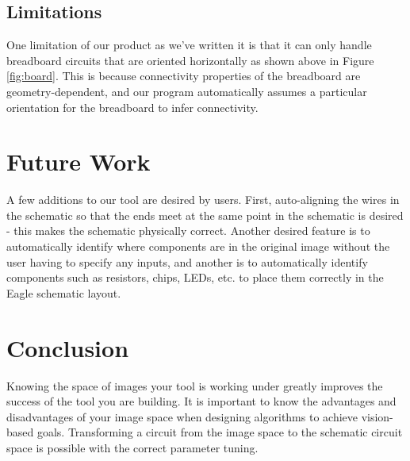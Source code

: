 \documentclass[10pt,twocolumn,letterpaper]{article}
\begin{document}
\subsection{Limitations}

One limitation of our product as we've written it is that it can only handle
breadboard circuits that are oriented horizontally as shown above in Figure
\ref{fig:board}. This is because connectivity properties of the breadboard are
geometry-dependent, and our program automatically assumes a particular
orientation for the breadboard to infer connectivity.  

\section{Future Work}

A few additions to our tool are desired by users. First, auto-aligning the
wires in the schematic so that the ends meet at the same point in the schematic
is desired - this makes the schematic physically correct. Another desired
feature is to automatically identify where components are in the original image
without the user having to specify any inputs, and another is to automatically
identify components such as resistors, chips, LEDs, etc. to place them
correctly in the Eagle schematic layout.  

\section{Conclusion}

Knowing the space of images your tool is working under greatly improves the
success of the tool you are building. It is important to know the advantages
and disadvantages of your image space when designing algorithms to achieve
vision-based goals. Transforming a circuit from the image space to the
schematic circuit space is possible with the correct parameter tuning. 

{\small


}
\end{document}

